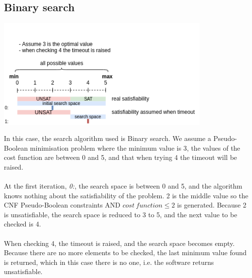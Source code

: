 \subsection{Binary search}
\begin{center}
	\includegraphics[width=0.8\textwidth]{Figures/GeneralTimeoutBinarySearch.png}
	\label{GeneralTimeoutBinarySearch}
\end{center}
In this case, the search algorithm used is Binary search. We assume a Pseudo-Boolean minimisation problem where the minimum value is 3, the values of the cost function are between 0 and 5, and that when trying 4 the timeout will be raised. \\\\
At the first iteration, \emph{0:}, the search space is between 0 and 5, and the algorithm knows nothing about the satisfiability of the problem. 2 is the middle value so the CNF Pseudo-Boolean constraints AND $cost \ function \leq 2$ is generated. Because 2 is unsatisfiable, the search space is reduced to 3 to 5, and the next value to be checked is 4. \\\\
When checking 4, the timeout is raised, and the search space becomes empty. Because there are no more elements to be checked, the last minimum value found is returned, which in this case there is no one, i.e. the software returns unsatisfiable. 